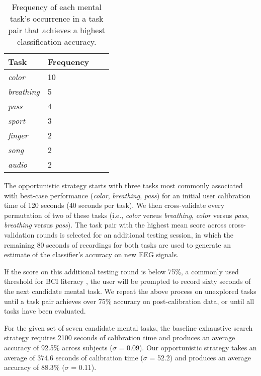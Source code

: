 \begin{table}[!h]
  \centering
  \begin{tabular}{ | l | l | l | p{5cm} |}
  \hline
  Task & Frequency \\ \hline
  \textit{color} & 10 \\ \hline
  \textit{breathing} & 5 \\ \hline
  \textit{pass} & 4 \\ \hline
  \textit{sport} & 3 \\ \hline
  \textit{finger} & 2 \\ \hline
  \textit{song} & 2 \\ \hline
  \textit{audio} & 2 \\ \hline
  \end{tabular}
  \caption{Frequency of each mental task's occurrence in a task pair that achieves a highest classification accuracy.}
  \label{table:name}
\end{table}

The opportunistic strategy starts with three tasks most commonly associated with best-case performance (\textit{color}, \textit{breathing}, \textit{pass}) for an initial user calibration time of 120 seconds (40 seconds per task). We then cross-validate every permutation of two of these tasks (i.e., \textit{color} versus \textit{breathing}, \textit{color} versus \textit{pass}, \textit{breathing} versus \textit{pass}). The task pair with the highest mean score across cross-validation rounds is selected for an additional testing session, in which the remaining 80 seconds of recordings for both tasks are used to generate an estimate of the classifier's accuracy on new EEG signals.

If the score on this additional testing round is below 75\%, a commonly used threshold for BCI literacy \cite{vidaurre_towards_2010}, the user will be prompted to record sixty seconds of the next candidate mental task. We repeat the above process on unexplored tasks until a task pair achieves over 75\% accuracy on post-calibration data, or until all tasks have been evaluated.


For the given set of seven candidate mental tasks, the baseline exhaustive search strategy requires 2100 seconds of calibration time and produces an average accuracy of 92.5\% across subjects (\textit{$\sigma$} = 0.09). Our opportunistic strategy takes an average of 374.6 seconds of calibration time (\textit{$\sigma$} = 52.2) and produces an average accuracy of 88.3\% (\textit{$\sigma$} = 0.11).

